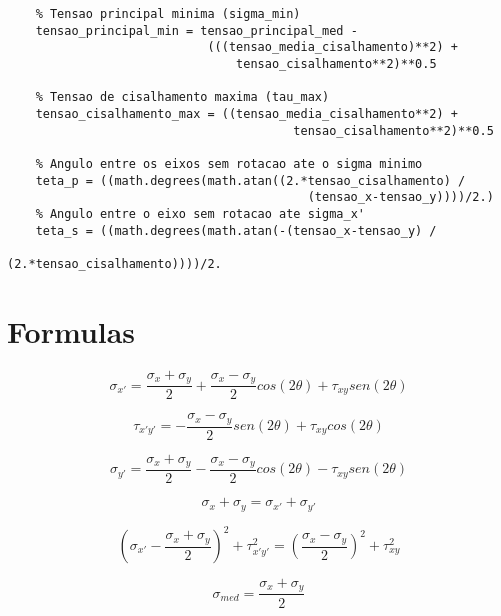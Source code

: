 \documentclass[a4paper]{article}
\begin{document}
\begin{lstlisting}
    % Tensao principal minima (sigma_min)
    tensao_principal_min = tensao_principal_med - 
                            (((tensao_media_cisalhamento)**2) + 
                                tensao_cisalhamento**2)**0.5

    % Tensao de cisalhamento maxima (tau_max)
    tensao_cisalhamento_max = ((tensao_media_cisalhamento**2) + 
                                        tensao_cisalhamento**2)**0.5

    % Angulo entre os eixos sem rotacao ate o sigma minimo
    teta_p = ((math.degrees(math.atan((2.*tensao_cisalhamento) /
                                          (tensao_x-tensao_y))))/2.)
    % Angulo entre o eixo sem rotacao ate sigma_x'
    teta_s = ((math.degrees(math.atan(-(tensao_x-tensao_y) /
                                          (2.*tensao_cisalhamento))))/2.
\end{lstlisting}


\section{Formulas}

\begin{equation}
	\label{sigma_x'}
	\sigma_{x'} = \frac{\sigma_x + \sigma_y}{2} + \frac{\sigma_x - \sigma_y}{2}cos(2 \theta) + \tau_{xy}sen(2\theta)
\end{equation}

\begin{equation}
	\label{tau_xy'}	
	\tau_{x'y'} = -\frac{\sigma_x - \sigma_y}{2}sen(2 \theta) + \tau_{xy}cos(2\theta)
\end{equation}

\begin{equation}
	\label{sigma_y'}
	\sigma_{y'} = \frac{\sigma_x + \sigma_y}{2} - \frac{\sigma_x - \sigma_y}{2}cos(2 \theta) - \tau_{xy}sen(2\theta)
\end{equation}

\begin{equation}
	\sigma_x + \sigma_y = \sigma_{x'} + \sigma_{y'}
\end{equation}

\begin{equation}
	(\sigma_{x'} - \frac{\sigma_x + \sigma_y}{2})^2 + \tau_{x'y'}^2 = (\frac{\sigma_x - \sigma_y}{2})^2 + \tau_{xy}^2
\end{equation}

\begin{equation}
	\sigma_{med} = \frac{\sigma_x + \sigma_y}{2} 
\end{equation}
\end{document}
